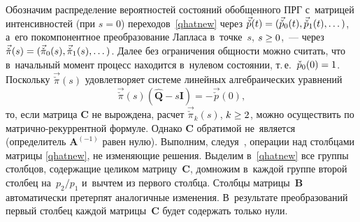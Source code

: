 \begin{multicols}{2}
    \begin{figure*}[b] %
\vspace*{8pt}
\begin{minipage}[t]{80mm}
\begin{center}
   \mbox{%
\epsfxsize=79mm 
}

\end{center}
\vspace*{-9pt}
\end{minipage}
\hfill
\vspace*{1pt}
\begin{minipage}[t]{80mm}
\begin{center}
   \mbox{%
\epsfxsize=79mm 
}

\end{center}
\vspace*{-9pt}
\end{minipage}
\end{figure*}

    
    \noindent 
    Обозначим распределение вероятностей
     состояний обобщенного ПРГ с~матрицей интенсивностей (при ${s=0}$) 
переходов~\eqref{qhatnew}
     через ${\vec{{\check p}}(t)\hm=(\vec{\check { p}}_0(t),\vec{\check { p}}_1(t),\dots)}$,
     а~его покомпонентное преобразование Лапласа в~точке~$s$, $s\hm\ge 0$,~--- 
     через ${\vec{{\check \pi}}(s)\hm=(\vec{\check { \pi}}_0(s),\vec{\check 
{\pi}}_1(s),\dots)}$. Далее без ограничения общности можно считать, что в~начальный момент процесс 
находится в~нулевом состоянии,  т.\,е.\
 ${{\check p}_0(0)\hm=1}$.
Поскольку ${\vec{{\check \pi}}(s)}$ удовлетворяет системе линейных 
алгебраических уравнений 
$$
{\vec{{\check \pi}}(s) ({\hat{\mathbf{Q}}}-s \mathbf{I})=-\vec{{\check  p}}(0)},
$$
то, если мат\-ри\-ца $\mathbf{C}$ не вырождена,
расчет ${\vec{\check {\pi}}_k(s)}$, ${k\hm\ge 2}$, можно осуществить по
мат\-рич\-но-ре\-кур\-рент\-ной формуле. Однако $\mathbf{C}$ обратимой не~является
(определитель ${\mathbf{A}^{(-1)}}$ равен нулю).
%
Выполним, следуя~\cite{zhang}, операции над столбцами матрицы \eqref{qhatnew},
не изменяющие решения.
Выделим в~\eqref{qhatnew} все группы столбцов, содержащие целиком мат\-ри\-цу~$\mathbf{C}$,
домножим в~каждой группе второй столбец на~${p_2/p_1}$ и~вычтем из первого 
столбца.
Столбцы мат\-ри\-цы~$\mathbf{B}$ автоматически претерпят аналогичные изменения.\linebreak 
В~результате преобразований первый столбец каж\-дой мат\-ри\-цы~$\mathbf{C}$ будет 
содержать только нули. 


\end{multicols}
